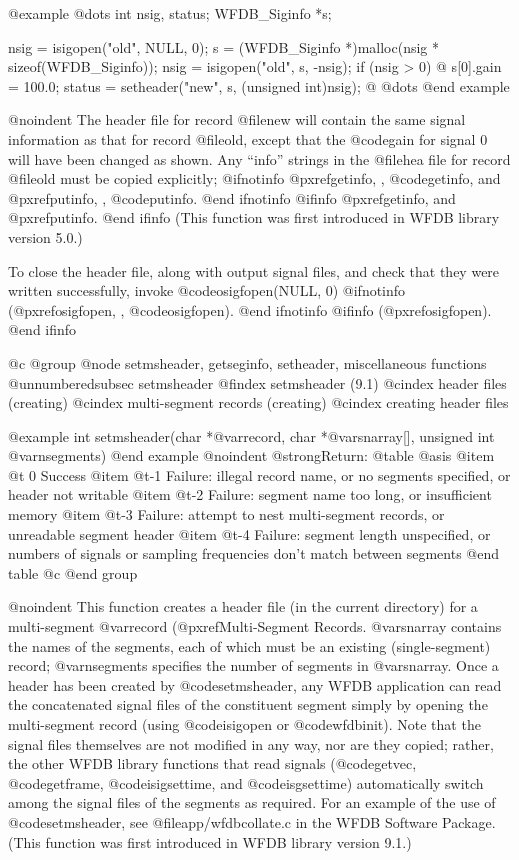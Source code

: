 {{{{{{{{@example
@dots{}
int nsig, status;
WFDB_Siginfo *s;

nsig = isigopen("old", NULL, 0);
s = (WFDB_Siginfo *)malloc(nsig * sizeof(WFDB_Siginfo));
nsig = isigopen("old", s, -nsig);
if (nsig > 0) @{
    s[0].gain = 100.0;
    status = setheader("new", s, (unsigned int)nsig);
@}
@dots{}
@end example

@noindent
The header file for record @file{new} will contain the same signal
information as that for record @file{old}, except that the @code{gain}
for signal 0 will have been changed as shown.  Any ``info'' strings in
the @file{hea} file for record @file{old} must be copied explicitly;
@ifnotinfo
@pxref{getinfo, , @code{getinfo}}, and @pxref{putinfo, , @code{putinfo}}.
@end ifnotinfo
@ifinfo
@pxref{getinfo}, and @pxref{putinfo}.
@end ifinfo
(This function was first
introduced in WFDB library version 5.0.)

To close the header file, along with output signal files, and check that they
were written successfully, invoke @code{osigfopen(NULL, 0)}
@ifnotinfo
(@pxref{osigfopen, , @code{osigfopen}}).
@end ifnotinfo
@ifinfo
(@pxref{osigfopen}).
@end ifinfo

@c @group
@node     setmsheader, getseginfo, setheader, miscellaneous functions
@unnumberedsubsec setmsheader
@findex setmsheader (9.1)
@cindex header files (creating)
@cindex multi-segment records (creating)
@cindex creating header files

@example
int setmsheader(char *@var{record}, char *@var{snarray}[], unsigned int @var{nsegments})
@end example
@noindent
@strong{Return:}
@table @asis
@item @t{ 0}
Success
@item @t{-1}
Failure: illegal record name, or no segments specified, or header not writable
@item @t{-2}
Failure: segment name too long, or insufficient memory
@item @t{-3}
Failure: attempt to nest multi-segment records, or unreadable segment
header
@item @t{-4}
Failure: segment length unspecified, or numbers of signals or sampling
frequencies don't match between segments
@end table
@c @end group

@noindent
This function creates a header file (in the current directory) for a
multi-segment @var{record} (@pxref{Multi-Segment Records}.  @var{snarray}
contains the names of the segments, each of which must be an existing
(single-segment) record; @var{nsegments} specifies the number of segments in
@var{snarray}.  Once a header has been created by @code{setmsheader}, any WFDB
application can read the concatenated signal files of the constituent segment
simply by opening the multi-segment record (using @code{isigopen} or
@code{wfdbinit}).  Note that the signal files themselves are not modified in
any way, nor are they copied; rather, the other WFDB library functions that
read signals (@code{getvec}, @code{getframe}, @code{isigsettime}, and
@code{isgsettime}) automatically switch among the signal files of the segments
as required.  For an example of the use of @code{setmsheader}, see
@file{app/wfdbcollate.c} in the WFDB Software Package.  (This function was
first introduced in WFDB library version 9.1.)

}}}}}}}}

